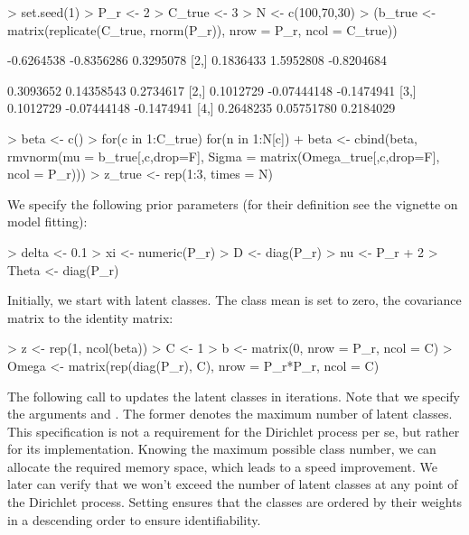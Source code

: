 \documentclass[article]{jss}
\newcommand{\fct}[1]{\code{#1()}}
\begin{document}
\begin{Schunk}
\begin{Sinput}
> set.seed(1)
> P_r <- 2
> C_true <- 3
> N <- c(100,70,30)
> (b_true <- matrix(replicate(C_true, rnorm(P_r)), nrow = P_r, ncol = C_true))
\end{Sinput}
\begin{Soutput}
           [,1]       [,2]       [,3]
[1,] -0.6264538 -0.8356286  0.3295078
[2,]  0.1836433  1.5952808 -0.8204684
\end{Soutput}
\begin{Soutput}
          [,1]        [,2]       [,3]
[1,] 0.3093652  0.14358543  0.2734617
[2,] 0.1012729 -0.07444148 -0.1474941
[3,] 0.1012729 -0.07444148 -0.1474941
[4,] 0.2648235  0.05751780  0.2184029
\end{Soutput}
\begin{Sinput}
> beta <- c()
> for(c in 1:C_true) for(n in 1:N[c])
+    beta <- cbind(beta, rmvnorm(mu = b_true[,c,drop=F], Sigma = matrix(Omega_true[,c,drop=F], ncol = P_r)))
> z_true <- rep(1:3, times = N)
\end{Sinput}
\end{Schunk}

We specify the following prior parameters (for their definition see the vignette on model fitting):

\begin{Schunk}
\begin{Sinput}
> delta <- 0.1
> xi <- numeric(P_r)
> D <- diag(P_r)
> nu <- P_r + 2
> Theta <- diag(P_r)
\end{Sinput}
\end{Schunk}

Initially, we start with  latent classes. The class mean  is set to zero, the covariance matrix  to the identity matrix:

\begin{Schunk}
\begin{Sinput}
> z <- rep(1, ncol(beta))
> C <- 1
> b <- matrix(0, nrow = P_r, ncol = C)
> Omega <- matrix(rep(diag(P_r), C), nrow = P_r*P_r, ncol = C)
\end{Sinput}
\end{Schunk}

The following call to \fct{update\_classes\_dp} updates the latent classes in  iterations. Note that we specify the arguments  and . The former denotes the maximum number of latent classes. This specification is not a requirement for the Dirichlet process per se, but rather for its implementation. Knowing the maximum possible class number, we can allocate the required memory space, which leads to a speed improvement. We later can verify that we won't exceed the number of  latent classes at any point of the Dirichlet process. Setting  ensures that the classes are ordered by their weights in a descending order to ensure identifiability.
\end{document}
